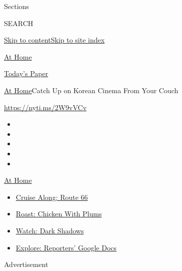 Sections

SEARCH

\protect\hyperlink{site-content}{Skip to
content}\protect\hyperlink{site-index}{Skip to site index}

\href{https://www.nytimes3xbfgragh.onion/spotlight/at-home}{At Home}

\href{https://myaccount.nytimes3xbfgragh.onion/auth/login?response_type=cookie\&client_id=vi}{}

\href{https://www.nytimes3xbfgragh.onion/section/todayspaper}{Today's
Paper}

\href{/spotlight/at-home}{At Home}\textbar{}Catch Up on Korean Cinema
From Your Couch

\url{https://nyti.ms/2W9vVCv}

\begin{itemize}
\item
\item
\item
\item
\item
\end{itemize}

\href{https://www.nytimes3xbfgragh.onion/spotlight/at-home?action=click\&pgtype=Article\&state=default\&region=TOP_BANNER\&context=at_home_menu}{At
Home}

\begin{itemize}
\tightlist
\item
  \href{https://www.nytimes3xbfgragh.onion/2020/09/07/travel/route-66.html?action=click\&pgtype=Article\&state=default\&region=TOP_BANNER\&context=at_home_menu}{Cruise
  Along: Route 66}
\item
  \href{https://www.nytimes3xbfgragh.onion/2020/09/04/dining/sheet-pan-chicken.html?action=click\&pgtype=Article\&state=default\&region=TOP_BANNER\&context=at_home_menu}{Roast:
  Chicken With Plums}
\item
  \href{https://www.nytimes3xbfgragh.onion/2020/09/04/arts/television/dark-shadows-stream.html?action=click\&pgtype=Article\&state=default\&region=TOP_BANNER\&context=at_home_menu}{Watch:
  Dark Shadows}
\item
  \href{https://www.nytimes3xbfgragh.onion/interactive/2020/at-home/even-more-reporters-editors-diaries-lists-recommendations.html?action=click\&pgtype=Article\&state=default\&region=TOP_BANNER\&context=at_home_menu}{Explore:
  Reporters' Google Docs}
\end{itemize}

Advertisement

